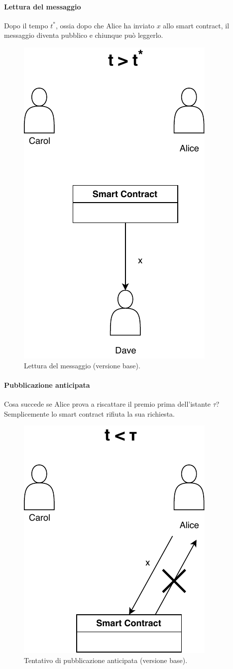 \paragraph{Lettura del messaggio}
Dopo il tempo $ t^{*} $, ossia dopo che Alice ha inviato $ x $ allo smart contract,
il messaggio diventa pubblico e
chiunque può leggerlo.
\begin{figure}[H]
	\centering
	\includegraphics[width=0.27\linewidth]{images/chap_protocollo/base-leggi.pdf}
	\caption{Lettura del messaggio (versione base).}
\end{figure}

\paragraph{Pubblicazione anticipata}
Cosa succede se Alice prova a riscattare il premio prima dell'istante $ \tau $?
Semplicemente lo smart contract rifiuta la sua richiesta.
\begin{figure}[H]
	\centering
	\includegraphics[width=0.3\linewidth]{images/chap_protocollo/base-anticipo.pdf}
	\caption{Tentativo di pubblicazione anticipata (versione base).}
\end{figure}

